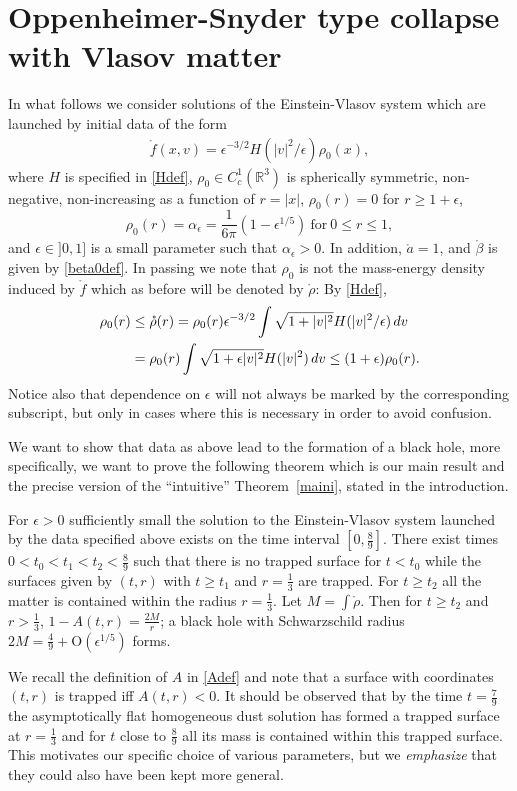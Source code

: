 \documentclass[11pt]{article}
\def\R{\mathbb R}
\begin{document}
%
%
\section{Oppenheimer-Snyder type collapse with Vlasov matter}
\label{section_OScollapse}
\setcounter{equation}{0}
%
%
In what follows we consider solutions of the Einstein-Vlasov
system which are launched by initial data of the form
\begin{align} \label{fdata_ndust}
  \mathring{f} (x,v) = \epsilon^{-3/2} H(|v|^2/\epsilon)
  \rho_0 (x),
\end{align}
where $H$ is specified in \eqref{Hdef},
$\rho_0\in C^1_c (\R^3)$ is spherically symmetric,
non-negative, non-increasing as a function of $r=|x|$,
$\rho_0 (r)=0$ for $r\geq 1+\epsilon$, 
\[
\rho_0(r) = \alpha_\epsilon =\frac{1}{6\pi}(1-\epsilon^{1/5})
\ \mbox{for}\ 0\leq r \leq 1,
\]
and $\epsilon \in ]0,1]$ is a small parameter such that $\alpha_\epsilon>0$. 
In addition,
$\mathring{a}=1$, and $\mathring{\beta}$ is given by \eqref{beta0def}.
In passing we note that $\rho_0$ is not the mass-energy density
induced by $\mathring f$ which as before will be denoted by $\mathring \rho$:
By \eqref{Hdef},
\begin{align} \label{rho0s}
  \rho_0(r)
  & \leq
  \mathring\rho (r)
  =
  \rho_0(r)
  \epsilon^{-3/2} \int \sqrt{1+|v|^2} H(|v|^2/\epsilon)\,dv\notag\\
  & =
  \rho_0(r)
  \int \sqrt{1+\epsilon |v|^2} H(|v|^2)\,dv
  \leq
  (1+\epsilon)\rho_0 (r).
\end{align}
Notice also that dependence on $\epsilon$ will not always be marked
by the corresponding subscript, but only in cases where this is necessary
in order to avoid confusion.

We want to show that data as above lead to the formation of a black hole,
more specifically, we want to prove the following theorem
which is our main result and the precise version of
the ``intuitive'' Theorem~\ref{maini}, stated in the introduction.
%
\begin{theorem}\label{maine}
  For $\epsilon>0$ sufficiently small the solution to the Einstein-Vlasov system
  launched by the data specified above exists on the time interval
  $[0,\frac{8}{9}]$.
  There exist times $0<t_0 < t_1 < t_2 < \frac{8}{9}$ such that 
  there is no trapped surface for $t<t_0$ while the surfaces given by
  $(t,r)$ with $t\geq t_1$ and $r=\frac{1}{3}$ are trapped. For $t\geq t_2$
  all the matter is contained within the 
  radius $r=\frac{1}{3}$. Let $M=\int\mathring\rho$. Then for
  $t\geq t_2$  and $r>\frac{1}{3}$, $1-A(t,r) = \frac{2M}{r}$;
  a black hole with Schwarzschild radius
  $2 M = \frac{4}{9} + \mathrm{O}(\epsilon^{1/5})$ forms.
\end{theorem}
%
We recall the definition of $A$ in \eqref{Adef} and note that
a surface with coordinates $(t,r)$
is trapped iff $A(t,r)<0$.
It should be observed that
by the time $t=\frac{7}{9}$ the asymptotically flat
homogeneous dust solution has formed a
trapped surface at $r=\frac{1}{3}$ and for $t$ close to $\frac{8}{9}$
all its mass is contained within this trapped surface. This motivates
our specific choice of various parameters, but we {\em emphasize} that
they could also have been kept more general.
\end{document}

